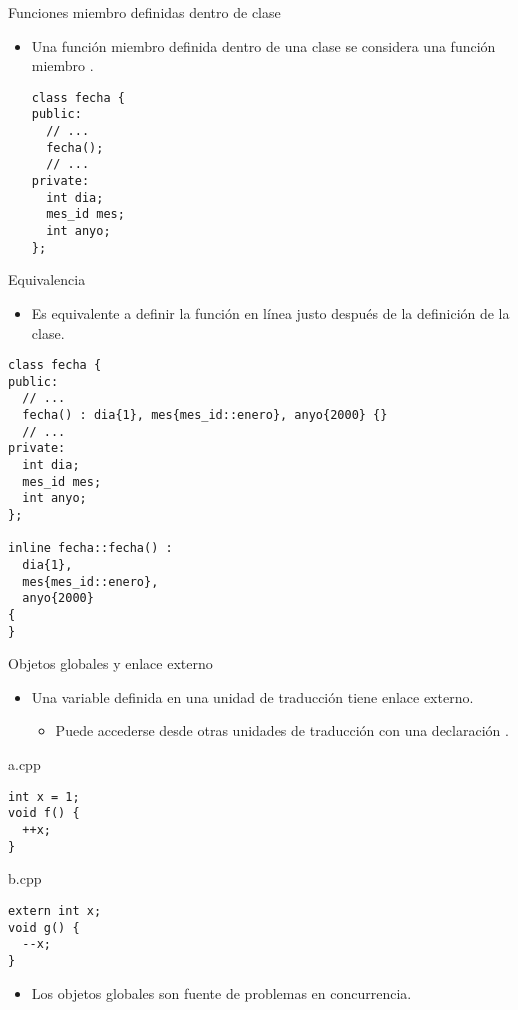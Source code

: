 \begin{frame}[fragile]{Funciones miembro definidas dentro de clase}
\begin{itemize}
  \item Una función miembro definida dentro de una clase se considera una función miembro .
\begin{lstlisting}
class fecha {
public:
  // ...
  fecha();
  // ...
private:
  int dia;
  mes_id mes;
  int anyo;
};
\end{lstlisting}
\end{itemize}
\end{frame}

\begin{frame}[fragile]{Equivalencia}
\begin{itemize}
  \item Es equivalente a definir la función en línea justo después de la definición de la clase.
\end{itemize}
\begin{lstlisting}
class fecha {
public:
  // ...
  fecha() : dia{1}, mes{mes_id::enero}, anyo{2000} {}
  // ...
private:
  int dia;
  mes_id mes;
  int anyo;
};

inline fecha::fecha() :
  dia{1},
  mes{mes_id::enero},
  anyo{2000}
{
}
\end{lstlisting}
\end{frame}

\begin{frame}[fragile]{Objetos globales y enlace externo}
\begin{itemize}
  \item Una variable definida en una unidad de traducción tiene enlace externo.
    \begin{itemize}
      \item Puede accederse desde otras unidades de traducción con una declaración .
    \end{itemize}
\end{itemize}
\begin{block}{a.cpp}
\begin{lstlisting}
int x = 1;
void f() {
  ++x;
}
\end{lstlisting}
\end{block}
\vspace{-0.25em}
\begin{block}{b.cpp}
\begin{lstlisting}
extern int x;
void g() {
  --x;
}
\end{lstlisting}
\end{block}
\begin{itemize}
  \item Los objetos globales son fuente de problemas en concurrencia.
\end{itemize}
\end{frame}

